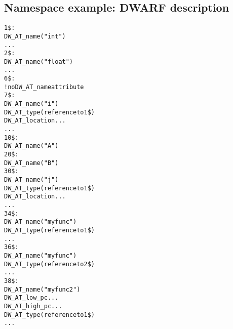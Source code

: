 \subsection{Namespace example: DWARF description}
\label{app:namespaceexampledwarfdescription}
\begin{alltt}

1\$:  
        DW\_AT\_name("int")
        ...
2\$:  
        DW\_AT\_name("float")
        ...
6\$:  
        ! no DW\_AT\_name attribute
7\$:
            DW\_AT\_name("i")
            DW\_AT\_type(reference to 1\$)
            DW\_AT\_location ...
            ...
10\$: 
        DW\_AT\_name("A")
20\$:    
            DW\_AT\_name("B")
30\$:        
                DW\_AT\_name("j")
                DW\_AT\_type(reference to 1\$)
                DW\_AT\_location ...
                ...
34\$:        
                DW\_AT\_name("myfunc")
                DW\_AT\_type(reference to 1\$)
                ...
36\$:        
                DW\_AT\_name("myfunc")
                DW\_AT\_type(reference to 2\$)
                ...
38\$:        
                DW\_AT\_name("myfunc2")
                DW\_AT\_low\_pc ...
                DW\_AT\_high\_pc ...
                DW\_AT\_type(reference to 1\$)
                ...


\end{alltt}
